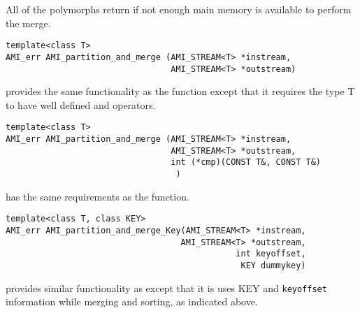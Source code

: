 All of the   polymorphs return
 if not enough
main memory is available to perform the merge.


%
%
\begin{verbatim}
template<class T>
AMI_err AMI_partition_and_merge (AMI_STREAM<T> *instream,
                                 AMI_STREAM<T> *outstream)
\end{verbatim}
provides the same functionality as the
 function except that it requires 
the type T to have well defined  \myverb{ < } and \myverb{ > } operators.

\begin{verbatim}
template<class T>               
AMI_err AMI_partition_and_merge (AMI_STREAM<T> *instream,
                                 AMI_STREAM<T> *outstream,
                                 int (*cmp)(CONST T&, CONST T&)
                                  )
\end{verbatim}
has the same requirements as the  function.
%
\begin{verbatim}
template<class T, class KEY>
AMI_err AMI_partition_and_merge_Key(AMI_STREAM<T> *instream,
                                   AMI_STREAM<T> *outstream, 
                                              int keyoffset, 
                                               KEY dummykey)
\end{verbatim}
provides similar functionality as 
except that it is  uses KEY and {\tt keyoffset}
information while merging and sorting, as indicated above.
%



